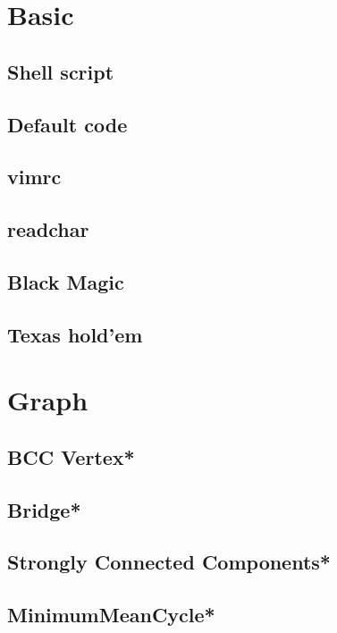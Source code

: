 \section{Basic}
\subsection{Shell script}

\subsection{Default code}

\subsection{vimrc}

\subsection{readchar}

\subsection{Black Magic}

\subsection{Texas hold'em}



\section{Graph}
\subsection{BCC Vertex*} %

\subsection{Bridge*} %

\subsection{Strongly Connected Components*} %

\subsection{MinimumMeanCycle*} %

